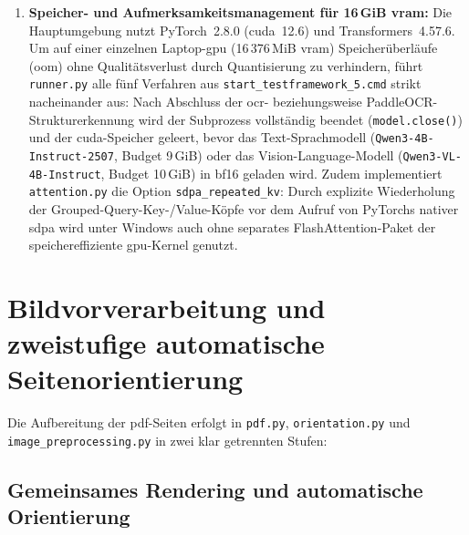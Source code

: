 \begin{enumerate}
  \item \textbf{Speicher- und Aufmerksamkeitsmanagement für \mbox{16\,GiB} \ac{vram}:} Die Hauptumgebung nutzt PyTorch~2.8.0 (\ac{cuda}~12.6) und Transformers~4.57.6. Um auf einer einzelnen Laptop-\ac{gpu} (\mbox{16\,376\,MiB} \ac{vram}) Speicherüberläufe (\ac{oom}) ohne Qualitätsverlust durch Quantisierung zu verhindern, führt \texttt{runner.py} alle fünf Verfahren aus \texttt{start\_testframework\_5.cmd} strikt nacheinander aus: Nach Abschluss der \ac{ocr}- beziehungsweise PaddleOCR-Strukturerkennung wird der Subprozess vollständig beendet (\texttt{model.close()}) und der \ac{cuda}-Speicher geleert, bevor das Text-Sprachmodell (\texttt{Qwen3-4B-Instruct-2507}, Budget \mbox{9\,GiB}) oder das Vision-Language-Modell (\texttt{Qwen3-VL-4B-Instruct}, Budget \mbox{10\,GiB}) in \ac{bf16} geladen wird. Zudem implementiert \texttt{attention.py} die Option \texttt{sdpa\_repeated\_kv}: Durch explizite Wiederholung der Grouped-Query-Key-/Value-Köpfe vor dem Aufruf von PyTorchs nativer \ac{sdpa} wird unter Windows auch ohne separates FlashAttention-Paket der speichereffiziente \ac{gpu}-Kernel genutzt.
\end{enumerate}

\section{Bildvorverarbeitung und zweistufige automatische Seitenorientierung}
\label{sec:umsetzung-vorverarbeitung}

Die Aufbereitung der \ac{pdf}-Seiten erfolgt in \texttt{pdf.py}, \texttt{orientation.py} und \texttt{image\_preprocessing.py} in zwei klar getrennten Stufen:

\subsection{Gemeinsames Rendering und automatische Orientierung}
\label{subsec:umsetzung-orientierung}

